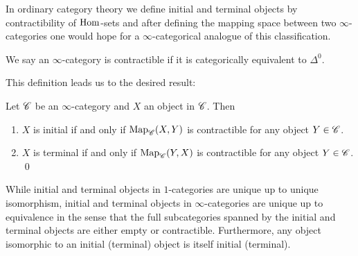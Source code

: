 \documentclass[../../thesis.tex]{subfiles}
\begin{document}
In ordinary category theory we define initial and terminal objects by contractibility of $\mathrm{Hom}$-sets and after defining the mapping space between two $\infty$-categories one would hope for a $\infty$-categorical analogue of this classification.
\begin{definition}
    We say an $\infty$-category is contractible if it is categorically equivalent to $\Delta^0$.
\end{definition}
This definition leads us to the desired result:
\begin{proposition}
    Let $\mathscr{C}$ be an $\infty$-category and $X$ an object in $\mathscr{C}$.
    Then
    \begin{enumerate}
        \item $X$ is initial if and only if $\mathrm{Map}_{\mathscr{C}}(X,Y)$ is contractible for any object $Y\in \mathscr{C}$.
        \item $X$ is terminal if and only if $\mathrm{Map}_{\mathscr{C}}(Y,X)$ is contractible for any object $Y\in \mathscr{C}$. \qed
    \end{enumerate}
\end{proposition}
While initial and terminal objects in $1$-categories are unique up to unique isomorphism, initial and terminal objects in $\infty$-categories are unique up to equivalence in the sense that the full subcategories spanned by the initial and terminal objects are either empty or contractible.
Furthermore, any object isomorphic to an initial (terminal) object is itself initial (terminal).
\end{document}
